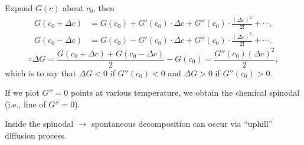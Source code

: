 \documentclass[12pt]{article}
\begin{document}
Expand $G(c)$ about $c_0$, then
\begin{align*}
	G(c_0 + \Delta c) & =
	G(c_0) + G'(c_0) \cdot \Delta c +
	G''(c_0) \cdot \frac{ (\Delta c)^2 }{ 2! }
	+ \cdots,\\
	G(c_0 - \Delta c) & =
	G(c_0) - G'(c_0) \cdot \Delta c +
	G''(c_0) \cdot \frac{ (\Delta c)^2 }{ 2! }
	+ \cdots.
\end{align*}
\begin{equation*}
	\therefore \Delta G = \frac{ G(c_0 + \Delta c) + G(c_0 - \Delta c) }{ 2 }
	- G(c_0) = \frac{ G''(c_0) (\Delta c)^2 }{ 2 },
\end{equation*}
which is to say that $\Delta G < 0$ if $G''(c_0) < 0$ and $\Delta G > 0$ if
$G''(c_0) > 0$.

If we plot $G'' = 0$ points at various temperature, we obtain the chemical
spinodal (i.e., line of $G'' = 0$).



Inside the spinodal $\rightarrow$ spontaneous decomposition can occur
via ``uphill'' diffusion process.
\end{document}
